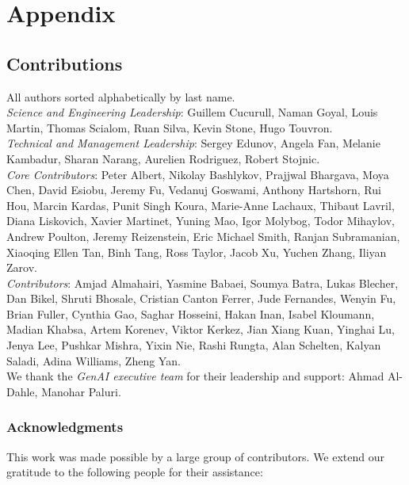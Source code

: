 \appendix
\section{Appendix}

\subsection{Contributions}
\label{app:contributinos}
All authors sorted alphabetically by last name. \\ 

\textit{Science and Engineering Leadership}: Guillem Cucurull, Naman Goyal, Louis Martin, Thomas Scialom, Ruan Silva, Kevin Stone, Hugo Touvron. \\

\textit{Technical and Management Leadership}: Sergey Edunov, Angela Fan, Melanie Kambadur, Sharan Narang, Aurelien Rodriguez, Robert Stojnic. \\

\textit{Core Contributors}: Peter Albert, Nikolay Bashlykov, Prajjwal Bhargava, Moya Chen, David Esiobu, Jeremy Fu, Vedanuj Goswami, Anthony Hartshorn, Rui Hou, Marcin Kardas, Punit Singh Koura, Marie-Anne Lachaux, Thibaut Lavril, Diana Liskovich, Xavier Martinet, Yuning Mao, Igor Molybog, Todor Mihaylov, Andrew Poulton, Jeremy Reizenstein, Eric Michael Smith, Ranjan Subramanian, Xiaoqing Ellen Tan, Binh Tang, Ross Taylor, Jacob Xu, Yuchen Zhang, Iliyan Zarov. \\

\textit{Contributors}: Amjad Almahairi, Yasmine Babaei, Soumya Batra, Lukas Blecher, Dan Bikel, Shruti Bhosale, Cristian Canton Ferrer, Jude Fernandes, Wenyin Fu, Brian Fuller, Cynthia Gao, Saghar Hosseini, Hakan Inan, Isabel Kloumann, Madian Khabsa, Artem Korenev, Viktor Kerkez, Jian Xiang Kuan, Yinghai Lu, Jenya Lee, Pushkar Mishra, Yixin Nie, Rashi Rungta, Alan Schelten, Kalyan Saladi, Adina Williams, Zheng Yan.\\

We thank the \textit{GenAI executive team} for their leadership and support: Ahmad Al-Dahle, Manohar Paluri. \\

\subsubsection{Acknowledgments}
This work was made possible by a large group of contributors. We extend our gratitude to the following people for their assistance:

